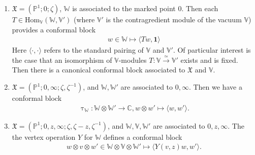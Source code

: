 \documentclass[12pt,a4paper,notitlepage]{article}
\theoremstyle{definition}
\theoremstyle{plain}
\newcommand{\fk}{\mathfrak}
\newcommand{\id}{\mathbf{1}}
\newcommand{\Hom}{\mathrm{Hom}}
\newcommand{\bk}[1]{\langle {#1}\rangle}
\newcommand{\Vbb}{\mathbb V}
\newcommand{\Wbb}{\mathbb W}
\newcommand{\Cbb}{\mathbb C}
\newcommand{\Pbb}{\mathbb P}
\numberwithin{equation}{section}
\begin{document}
\begin{enumerate}
\item $\fk X=(\Pbb^1;0;\zeta)$, $\Wbb$ is associated to the marked point $0$. Then each $T\in\Hom_\Vbb(\Wbb,\Vbb')$ (where $\Vbb'$ is the contragredient module of the vacuum $\Vbb$) provides a conformal block
\begin{align*}
w\in\Wbb\mapsto \bk{Tw,\id}	
\end{align*}
Here $\bk{\cdot,\cdot}$ refers to the standard pairing of $\Vbb$ and $\Vbb'$. Of particular interest is the case that an isomorphism of $\Vbb$-modules $T:\Vbb\xrightarrow{\simeq}\Vbb'$ exists and is fixed. Then there is a canonical conformal block associated to $\fk X$ and $\Vbb$.
\item $\fk X=(\Pbb^1;0,\infty;\zeta,\zeta^{-1})$, and $\Wbb,\Wbb'$ are associated to $0,\infty$. Then  we have a conformal block
\begin{align}
\uptau_\Wbb:\Wbb\otimes\Wbb'\rightarrow\Cbb,w\otimes w'\mapsto \bk{w,w'}.	\label{eq58}
\end{align}
\item $\fk X=(\Pbb^1;0,z,\infty;\zeta,\zeta-z,\zeta^{-1})$, and $\Wbb,\Vbb,\Wbb'$ are associated to $0,z,\infty$. The the vertex operation $Y$ for $\Wbb$ defines a conformal block
\begin{align}
w\otimes v\otimes w'\in\Wbb\otimes\Vbb\otimes\Wbb'\mapsto \bk{Y(v,z)w,w'}.\label{eq55}
\end{align}
\end{enumerate}
\end{document}
